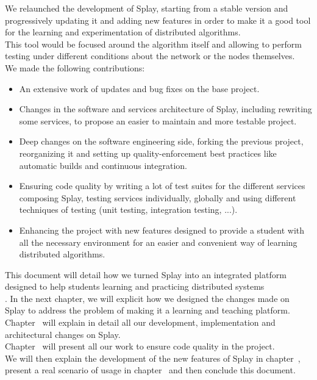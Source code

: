 \documentclass{eplmastersthesis}
\begin{document}
      We relaunched the development of Splay, starting from a stable
      version and progressively updating it and adding new
      features in order to make it a good tool for the learning and
      experimentation of distributed algorithms.\\
      This tool would be focused around the algorithm itself and allowing to
      perform testing under different conditions about the network or
      the nodes themselves.\\

      We made the following contributions:

      \begin{itemize}
        \item An extensive work of updates and bug fixes on the base project.
        \item Changes in the software and services architecture of Splay,
        including rewriting some services, to propose an easier to maintain and
        more testable project.
        \item Deep changes on the software engineering side, forking the
        previous project, reorganizing it and setting up quality-enforcement
        best practices like automatic builds and continuous integration.
        \item Ensuring code quality by writing a lot of test suites for the
        different services composing Splay, testing services individually,
        globally and using different techniques of testing (unit testing,
        integration testing, ...).
        \item Enhancing the project with new features designed to provide a
        student with all the necessary environment for an easier and convenient
        way of learning distributed algorithms.
      \end{itemize}

      This document will detail how we turned Splay into an integrated platform
      designed to help students learning and practicing distributed systems\\.
      In the next chapter, we will explicit how we designed the changes made on
      Splay to address the problem of making it a learning and teaching
      platform.\\
      Chapter~\cite{chap:dev} will explain in detail all our development,
      implementation and architectural changes on Splay.\\
      Chapter~\cite{chap:qual} will present all our work to ensure code quality
      in the project.\\
      We will then explain the development of the new features
      of Splay in chapter~\cite{chap:newfeat}, present a real scenario of usage
      in chapter~\cite{chap:usercase} and then conclude this document.
\end{document}
